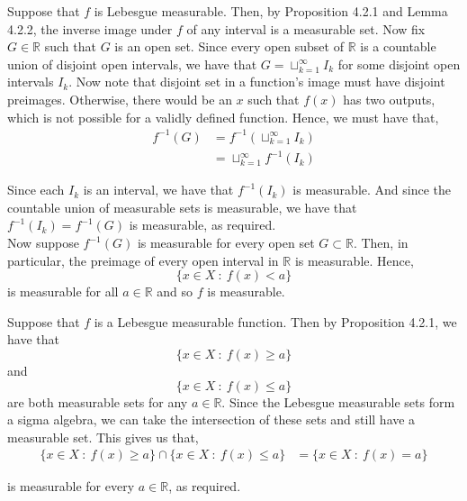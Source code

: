\documentclass[12pt]{article}
\newenvironment{problem}[2][Problem]{\begin{trivlist}
\item[\hskip \labelsep {\bfseries #1}\hskip \labelsep {\bfseries #2.}]}{\end{trivlist}}
\begin{document}
Suppose that $f$ is Lebesgue measurable. Then, by Proposition 4.2.1 and Lemma 4.2.2, the inverse image under $f$ of any interval is a measurable set. Now fix $G \in \mathbb{R}$ such that $G$ is an open set. Since every open subset of $\mathbb{R}$ is a countable union of disjoint open intervals, we have that $G = \sqcup_{k=1}^{\infty} I_k$ for some disjoint open intervals $I_k$. Now note that disjoint set in a function's image must have disjoint preimages. Otherwise, there would be an $x$ such that $f(x)$ has two outputs, which is not possible for a validly defined function. Hence, we must have that,
\begin{align*}
f^{-1}(G) &= f^{-1}\left(\sqcup_{k=1}^{\infty} I_k \right)\\
&= \sqcup_{k=1}^{\infty} f^{-1}(I_k)
\end{align*}

Since each $I_k$ is an interval, we have that $f^{-1}(I_k)$ is measurable. And since the countable union of measurable sets is measurable, we have that $f^{-1}(I_k) = f^{-1}(G)$ is measurable, as required.\\

Now suppose $f^{-1}(G)$ is measurable for every open set $G \subset \mathbb{R}$. Then, in particular, the preimage of every open interval in $\mathbb{R}$ is measurable. Hence, $$\{x \in X \ : \ f(x) < a\}$$ is measurable for all $a \in \mathbb{R}$ and so $f$ is measurable.

\begin{problem}{7}
\end{problem}

\begin{problem}{8}
\end{problem}

\begin{problem}{9}
\end{problem}

Suppose that $f$ is a Lebesgue measurable function. Then by Proposition 4.2.1, we have that $$\{x \in X \ : \ f(x) \geq a\}$$ and $$\{x \in X \ : \ f(x) \leq a\}$$ are both measurable sets for any $a \in \mathbb{R}$. Since the Lebesgue measurable sets form a sigma algebra, we can take the intersection of these sets and still have a measurable set. This gives us that,
\begin{align*}
\{x \in X \ : \ f(x) \geq a\} \cap \{x \in X \ : \ f(x) \leq a\} &= \{x \in X \ : \ f(x) = a\}
\end{align*}

is measurable for every $a \in \mathbb{R}$, as required.

\begin{problem}{10}
\end{problem}
\end{document}
